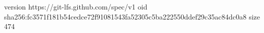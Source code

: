 version https://git-lfs.github.com/spec/v1
oid sha256:fc3571f181b54cedce72f91081543fa52305c5ba222550ddef29c35ac84dc0a8
size 474
